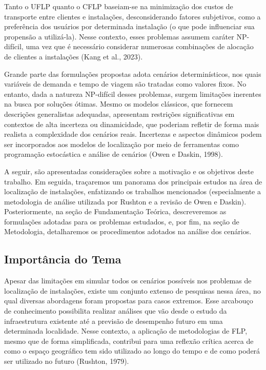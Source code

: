 \documentclass[12pt]{article}
\begin{document}
Tanto o UFLP quanto o CFLP baseiam-se na minimização dos custos de transporte entre clientes e instalações, desconsiderando fatores subjetivos, como a preferência dos usuários por determinada instalação (o que pode influenciar sua propensão a utilizá-la). Nesse contexto, esses problemas assumem caráter NP-difícil, uma vez que é necessário considerar numerosas combinações de alocação de clientes a instalações (Kang et al., 2023).

Grande parte das formulações propostas adota cenários determinísticos, nos quais variáveis de demanda e tempo de viagem são tratadas como valores fixos. No entanto, dada a natureza NP-difícil desses problemas, surgem limitações inerentes na busca por soluções ótimas. Mesmo os modelos clássicos, que fornecem descrições generalistas adequadas, apresentam restrições significativas em contextos de alta incerteza ou dinamicidade, que poderiam refletir de forma mais realista a complexidade dos cenários reais. Incertezas e aspectos dinâmicos podem ser incorporados aos modelos de localização por meio de ferramentas como programação estocástica e análise de cenários (Owen e Daskin, 1998).

A seguir, são apresentadas considerações sobre a motivação e os objetivos deste trabalho. Em seguida, traçaremos um panorama dos principais estudos na área de localização de instalações, enfatizando os trabalhos mencionados (especialmente a metodologia de análise utilizada por Rushton e a revisão de Owen e Daskin). Posteriormente, na seção de Fundamentação Teórica, descreveremos as formulações adotadas para os problemas estudados, e, por fim, na seção de Metodologia, detalharemos os procedimentos adotados na análise dos cenários.

\subsection{Importância do Tema}

Apesar das limitações em simular todos os cenários possíveis nos problemas de localização de instalações, existe um conjunto extenso de pesquisas nessa área, no qual diversas abordagens foram propostas para casos extremos. Esse arcabouço de conhecimento possibilita realizar análises que vão desde o estudo da infraestrutura existente até a previsão de desempenho futuro em uma determinada localidade. Nesse contexto, a aplicação de metodologias de FLP, mesmo que de forma simplificada, contribui para uma reflexão crítica acerca de como o espaço geográfico tem sido utilizado ao longo do tempo e de como poderá ser utilizado no futuro (Rushton, 1979).
\end{document}
